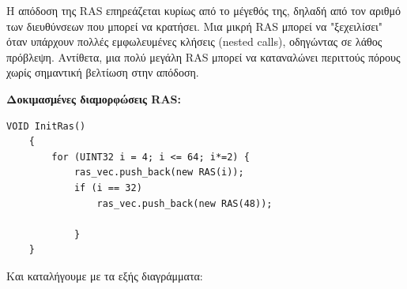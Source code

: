 \documentclass{article}
\begin{document}
Η απόδοση της RAS επηρεάζεται κυρίως από το μέγεθός της, δηλαδή από τον αριθμό των διευθύνσεων που μπορεί να κρατήσει. Μια μικρή RAS μπορεί να "ξεχειλίσει" όταν υπάρχουν πολλές εμφωλευμένες κλήσεις (nested calls), οδηγώντας σε λάθος πρόβλεψη. Αντίθετα, μια πολύ μεγάλη RAS μπορεί να καταναλώνει περιττούς πόρους χωρίς σημαντική βελτίωση στην απόδοση.

\vspace{0.3cm} \textbf{Δοκιμασμένες διαμορφώσεις RAS:}

\begin{lstlisting}[style=cppstyle]
    VOID InitRas()
    {
        for (UINT32 i = 4; i <= 64; i*=2) {
            ras_vec.push_back(new RAS(i));
            if (i == 32)
                ras_vec.push_back(new RAS(48));
    
            }
    }
\end{lstlisting}

Και καταλήγουμε με τα εξής διαγράμματα:
\end{document}
